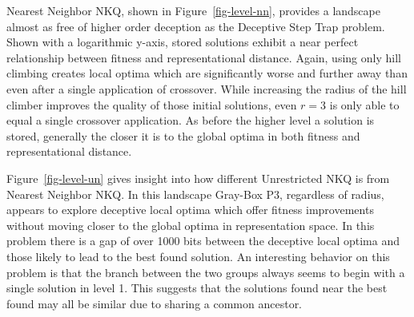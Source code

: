 \begin{figure*}
  \centering
  \caption{Distribution of local optima stored at each level of Gray-Box P3 in relation to the best found by the run on
           a Nearest Neighbor NKQ problem $N=6000$ and $K=4$.}
  \label{fig-level-nn}
\end{figure*}

Nearest Neighbor NKQ, shown in Figure~\ref{fig-level-nn}, provides a landscape almost as free of higher order deception
as the Deceptive Step Trap problem.  Shown with a logarithmic y-axis, stored solutions exhibit a near perfect relationship
between fitness and representational distance. Again, using only hill climbing creates local optima which are significantly
worse and further away than even
after a single application of crossover. While increasing the radius of the hill climber improves the quality of those initial
solutions, even $r=3$ is only able to equal a single crossover application. As before the higher level a solution is stored,
generally the closer it is to the global optima in both fitness and representational distance.

\begin{figure*}
  \centering
  \caption{Distribution of local optima stored at each level of Gray-Box P3 in relation to the best found by the run on
           an Unrestricted NKQ problem $N=6000$ and $K=4$.}
  \label{fig-level-un}
\end{figure*}

Figure~\ref{fig-level-un} gives insight into how different Unrestricted NKQ is from Nearest Neighbor NKQ. In this landscape
Gray-Box P3, regardless of radius, appears to explore deceptive local optima which offer fitness improvements without moving
closer to the global optima in representation space. In this problem there is a gap of over 1000 bits between the deceptive
local optima and those likely to lead to the best found solution. An interesting behavior on this problem is that the branch
between the two groups always seems to begin with a single solution in level 1. This suggests that the solutions found near
the best found may all be similar due to sharing a common ancestor.

\begin{figure*}
  \centering
  \caption{Distribution of local optima stored at each level of Gray-Box P3 in relation to the best found by the run on an Ising Spin Glass
           $N=6084$.}
  \label{fig-level-is}
\end{figure*}

